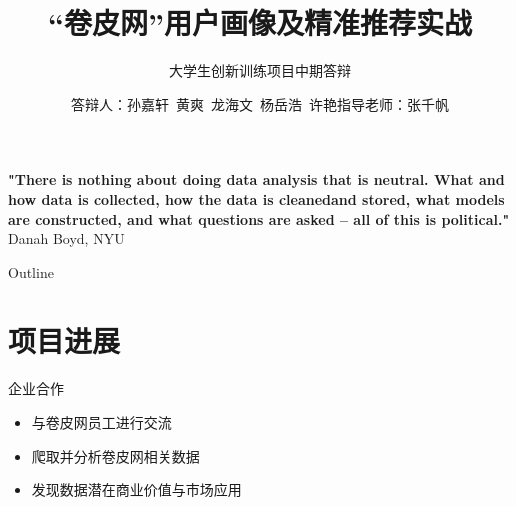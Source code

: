 \documentclass[10pt]{beamer}
\title[中期答辩]{“卷皮网”用户画像及精准推荐实战}
\subtitle{大学生创新训练项目中期答辩}
\author[用户画像与机器学习实战]{答辩人：孙嘉轩\ 黄爽\ 龙海文\ 杨岳浩\ 许艳\newline \newline 指导老师：张千帆}
\institute[]{华中科技大学管理学院}
\begin{document}

\frame{\titlepage}
\begin{frame}
\textbf{"There is nothing about doing data analysis that is neutral.\newline
What and how data is collected, how the data is cleaned\newline and
stored, what models are constructed, and what questions are
asked – all of this is political."}
\newline Danah Boyd, NYU

\end{frame}

\begin{frame}{Outline}
\tableofcontents
\end{frame}

\section{项目进展}

\begin{frame}{企业合作}
  \begin{itemize}
  \item 与卷皮网员工进行交流
  \newline
  \item 爬取并分析卷皮网相关数据
  \newline
  \item 发现数据潜在商业价值与市场应用
  \end{itemize}
\end{frame}

\end{document}
